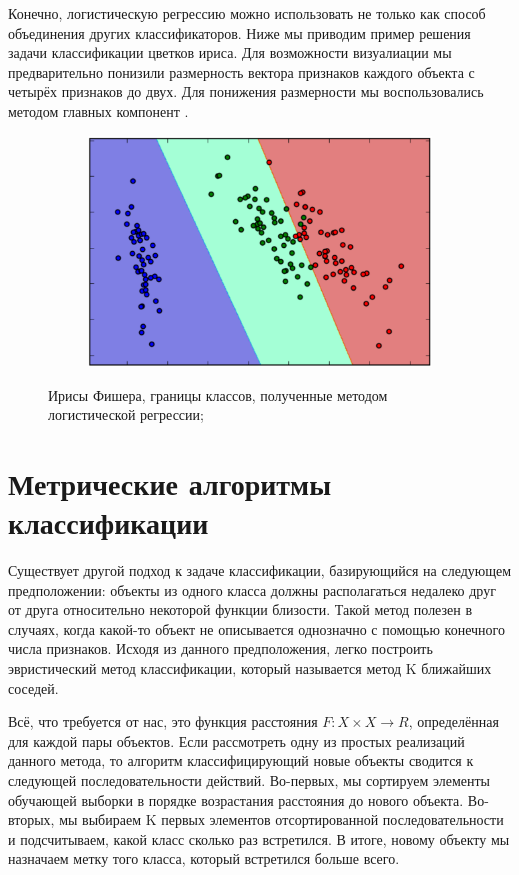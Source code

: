 Конечно, логистическую регрессию можно использовать не только как способ объединения других классификаторов. Ниже мы приводим пример решения задачи классификации цветков ириса. Для возможности визуалиации мы предварительно понизили размерность вектора признаков каждого объекта с четырёх признаков до двух. Для понижения размерности мы воспользовались методом главных компонент \cite{pca_book}\cite{pca_program}.

\begin{figure}[ht]
	\centering
    \begin{subfigure}[b]{1\textwidth}
    \centering
        \includegraphics[scale=0.5]{pasted-image-19.png}        
    \end{subfigure}
 
    \caption{Ирисы Фишера, границы классов, полученные методом логистической регрессии;}
    \label{fig_parsetree}
\end{figure}

\section{Метрические алгоритмы классификации}

Существует другой подход к задаче классификации, базирующийся на следующем предположении: объекты из одного класса должны располагаться недалеко друг от друга относительно некоторой функции близости. Такой метод полезен в случаях, когда какой-то объект не описывается однозначно с помощью конечного числа признаков. Исходя из данного предположения, легко построить эвристический метод классификации, который называется метод K ближайших соседей.

Всё, что требуется от нас, это функция расстояния $F : X \times X \to R$, определённая для каждой пары объектов. Если рассмотреть одну из простых реализаций данного метода, то алгоритм классифицирующий новые объекты сводится к следующей последовательности действий.
Во-первых, мы сортируем элементы обучающей выборки в порядке возрастания  расстояния до нового объекта.
Во-вторых, мы выбираем K первых элементов отсортированной последовательности и подсчитываем, какой класс сколько раз встретился.
В итоге, новому объекту мы назначаем метку того класса, который встретился больше всего.

